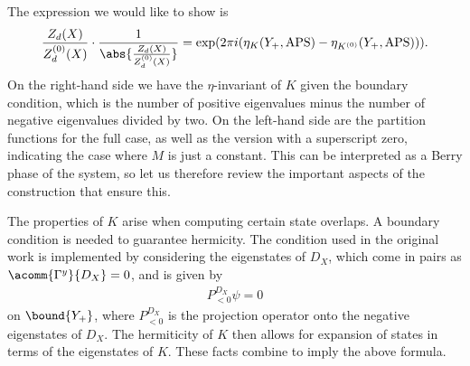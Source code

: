 The expression we would like to show is
\begin{align*}
	\frac{Z_{d}(X)}{Z_{d}^{(0)}(X)}\cdot\frac{1}{\abs{\frac{Z_{d}(X)}{Z_{d}^{(0)}(X)}}} = \exp(2\pi i(\eta_{K}(Y_{+}, \text{APS}) - \eta_{K^{(0)}}(Y_{+}, \text{APS}))).
\end{align*}
On the right-hand side we have the $\eta$-invariant of $K$ given the boundary condition, which is the number of positive eigenvalues minus the number of negative eigenvalues divided by two. On the left-hand side are the partition functions for the full case, as well as the version with a superscript zero, indicating the case where $M$ is just a constant. This can be interpreted as a Berry phase of the system, so let us therefore review the important aspects of the construction that ensure this.

The properties of $K$ arise when computing certain state overlaps. A boundary condition is needed to guarantee hermicity. The condition used in the original work is implemented by considering the eigenstates of $D_{X}$, which come in pairs as $\acomm{\Gamma^{y}}{D_{X}} = 0$, and is given by
\begin{align*}
	P^{D_{X}}_{< 0}\psi = 0
\end{align*}
on $\bound{Y_{+}}$, where $P^{D_{X}}_{< 0}$ is the projection operator onto the negative eigenstates of $D_{X}$. The hermiticity of $K$ then allows for expansion of states in terms of the eigenstates of $K$. These facts combine to imply the above formula.

